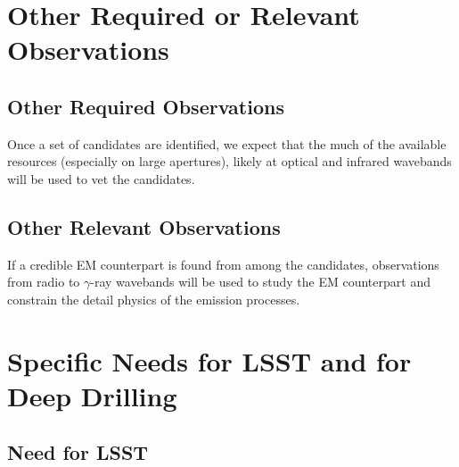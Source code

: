 \documentclass [11pt]{article}
\begin{document}
\section{Other Required or Relevant Observations}


\subsection{Other Required Observations}

%
Once a set of candidates are identified, we expect that the much of the available resources (especially on large apertures), likely at optical and infrared wavebands will be used to vet the candidates.


\subsection{Other Relevant Observations}

If a credible EM counterpart is found from among the candidates, observations from radio to $\gamma$-ray wavebands will be used to study the EM counterpart and constrain the detail physics of the emission processes.


\section{Specific Needs for LSST and for Deep Drilling}


\subsection{Need for LSST}

%
\end{document}
